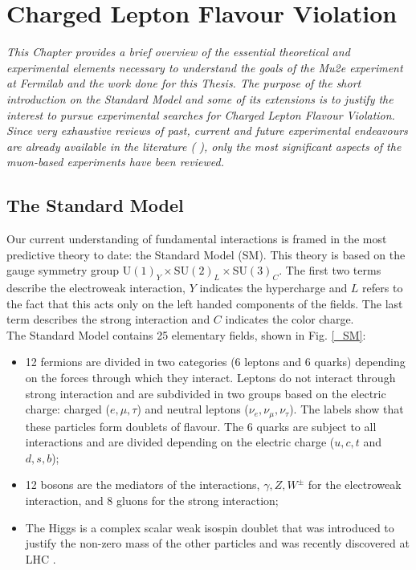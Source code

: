 \documentclass[12pt,a4paper,openright, oneside, titlepage]{book} %
\begin{document}
\tableofcontents
\listoffigures
\listoftables

\mainmatter
\chapter{Charged Lepton Flavour Violation}

{\itshape 
This Chapter provides a brief overview of the essential theoretical and experimental elements necessary to understand the goals of the Mu2e experiment at Fermilab and the work done for this Thesis. 
The purpose of the short introduction on the Standard Model and some of its extensions is to justify the interest to pursue experimental searches for Charged Lepton Flavour Violation. 
Since very exhaustive reviews of past, current and future experimental endeavours are already available in the literature (\cite{Signorelli} \cite{bob_cflv}), only the most significant aspects of the muon-based experiments have been reviewed.\\}  

\section{The Standard Model}
Our current understanding of fundamental interactions is framed in the most predictive theory to date: the Standard Model (SM). 
This theory is based on the gauge symmetry group U$(1)_Y \times $SU$(2)_L\times $SU$(3)_C$.
The first two terms describe the electroweak interaction, $Y$ indicates the hypercharge and $L$ refers to the fact that this acts only on the left handed components of the fields. 
The last term describes the strong interaction and $C$ indicates the color charge.\\
The Standard Model contains 25 elementary fields, shown in Fig. \ref{_SM}: 
\begin{itemize}
\item 12 fermions are divided in two categories (6 leptons and 6 quarks) depending on the forces through which they interact.
Leptons do not interact through strong interaction and are subdivided in two groups based on the electric charge: charged ($e,\mu,\tau$) and neutral leptons ($\nu_e,\nu_\mu,\nu_\tau$). 
The labels show that these particles form doublets of flavour.
The 6 quarks are subject to all interactions and are divided depending on the electric charge ($u,c,t$ and $d,s,b$);
\item 12 bosons are the mediators of the interactions, $\gamma,Z,W^\pm$ for the electroweak interaction, and 8 gluons for the strong interaction;
\item The Higgs is a complex scalar weak isospin doublet that was introduced to justify the non-zero mass of the other particles and was recently discovered at LHC \cite{H:CMS}\cite{H:ATLAS}.
\end{itemize}
\end{document}
